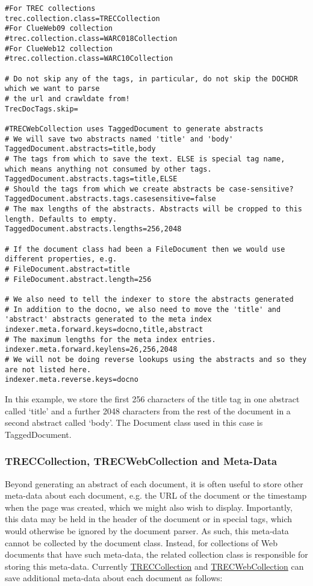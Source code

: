 \begin{verbatim}
#For TREC collections
trec.collection.class=TRECCollection
#For ClueWeb09 collection
#trec.collection.class=WARC018Collection
#For ClueWeb12 collection
#trec.collection.class=WARC10Collection

# Do not skip any of the tags, in particular, do not skip the DOCHDR which we want to parse
# the url and crawldate from!
TrecDocTags.skip=

#TRECWebCollection uses TaggedDocument to generate abstracts
# We will save two abstracts named 'title' and 'body'
TaggedDocument.abstracts=title,body
# The tags from which to save the text. ELSE is special tag name, which means anything not consumed by other tags.
TaggedDocument.abstracts.tags=title,ELSE
# Should the tags from which we create abstracts be case-sensitive?
TaggedDocument.abstracts.tags.casesensitive=false
# The max lengths of the abstracts. Abstracts will be cropped to this length. Defaults to empty.
TaggedDocument.abstracts.lengths=256,2048

# If the document class had been a FileDocument then we would use different properties, e.g.
# FileDocument.abstract=title
# FileDocument.abstract.length=256

# We also need to tell the indexer to store the abstracts generated
# In addition to the docno, we also need to move the 'title' and 'abstract' abstracts generated to the meta index
indexer.meta.forward.keys=docno,title,abstract
# The maximum lengths for the meta index entries.
indexer.meta.forward.keylens=26,256,2048
# We will not be doing reverse lookups using the abstracts and so they are not listed here.
indexer.meta.reverse.keys=docno
\end{verbatim}

In this example, we store the first 256 characters of the title tag in
one abstract called `title' and a further 2048 characters from the rest
of the document in a second abstract called `body'. The Document class
used in this case is TaggedDocument.

\subsubsection{TRECCollection, TRECWebCollection and
Meta-Data}\label{treccollection-trecwebcollection-and-meta-data}

Beyond generating an abstract of each document, it is often useful to
store other meta-data about each document, e.g. the URL of the document
or the timestamp when the page was created, which we might also wish to
display. Importantly, this data may be held in the header of the
document or in special tags, which would otherwise be ignored by the
document parser. As such, this meta-data cannot be collected by the
document class. Instead, for collections of Web documents that have such
meta-data, the related collection class is responsible for storing this
meta-data. Currently
\href{javadoc/org/terrier/indexing/TRECCollection.html}{TRECCollection}
and
\href{javadoc/org/terrier/indexing/TRECWebCollection.html}{TRECWebCollection}
can save additional meta-data about each document as follows:

